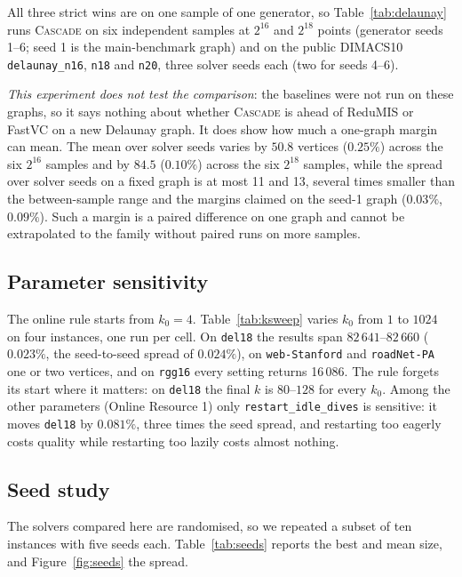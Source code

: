 \documentclass[pdflatex,sn-mathphys-num]{sn-jnl}
\theoremstyle{thmstyleone}%
\theoremstyle{thmstyletwo}%
\begin{document}
All three strict wins are on one sample of one generator, so Table~\ref{tab:delaunay}
runs \textsc{Cascade} on six independent samples at $2^{16}$ and $2^{18}$ points
(generator seeds 1--6; seed 1 is the main-benchmark graph) and on the public DIMACS10
\texttt{delaunay\_n16}, \texttt{n18} and \texttt{n20}, three solver seeds each (two for
seeds 4--6).



\emph{This experiment does not test the comparison}: the baselines were not run on these
graphs, so it says nothing about whether \textsc{Cascade} is ahead of ReduMIS or FastVC
on a new Delaunay graph. It does show how much a one-graph margin can mean. The mean over
solver seeds varies by $50.8$ vertices ($0.25\%$) across the six $2^{16}$ samples and by
$84.5$ ($0.10\%$) across the six $2^{18}$ samples, while the spread over solver seeds on
a fixed graph is at most 11 and 13, several times smaller than the between-sample range and
the margins claimed on the seed-1 graph ($0.03\%$, $0.09\%$). Such a margin is a paired
difference on one graph and cannot be extrapolated to the family without paired runs on
more samples.

\subsection{Parameter sensitivity}
\label{sec:sensitivity}

The online rule starts from $k_0=4$. Table~\ref{tab:ksweep} varies $k_0$ from $1$ to
$1024$ on four instances, one run per cell. On \texttt{del18} the results span
$82\,641$--$82\,660$ ($0.023\%$, the seed-to-seed spread of $0.024\%$), on
\texttt{web-Stanford} and \texttt{roadNet-PA} one or two vertices, and on \texttt{rgg16}
every setting returns 16\,086. The rule forgets its start where it matters: on
\texttt{del18} the final $k$ is $80$--$128$ for every $k_0$. Among the other parameters
(Online Resource 1) only \texttt{restart\_idle\_dives} is sensitive: it moves \texttt{del18}
by $0.081\%$, three times the seed spread, and restarting too eagerly costs quality
while restarting too lazily costs almost nothing.



\subsection{Seed study}

The solvers compared here are randomised, so we repeated a subset of ten
instances with five seeds each. Table~\ref{tab:seeds} reports the best and mean
size, and Figure~\ref{fig:seeds} the spread.
\end{document}
